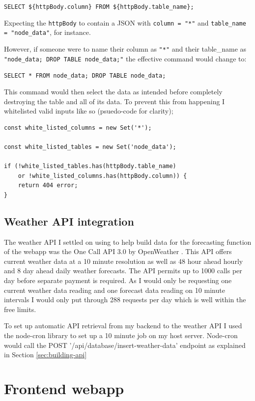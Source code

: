 \verb|SELECT ${httpBody.column} FROM ${httpBody.table_name};|

Expecting the \verb|httpBody| to contain a JSON with \texttt{column = "*"} and
\texttt{table\_name = "node\_data"}, for instance.

However, if someone were to name their column as \texttt{"*"} and their
table\_name as \texttt{"node\_data; DROP TABLE node\_data;"} the effective
command would change to:

\verb|SELECT * FROM node_data; DROP TABLE node_data;|

This command would then select the data as intended before completely destroying
the table and all of its data. To prevent this from happening I whitelisted
valid inputs like so (psuedo-code for clarity);

\begin{verbatim}
const white_listed_columns = new Set('*');

const white_listed_tables = new Set('node_data');

if (!white_listed_tables.has(httpBody.table_name) 
    or !white_listed_columns.has(httpBody.column)) {
    return 404 error;
}
\end{verbatim}

\subsection{Weather API integration}\label{sec:weather-api}

The weather API I settled on using to help build data for the forecasting
function of the webapp was the One Call API 3.0 by OpenWeather
\cite{openweatherAPI}. This API offers current weather data at a 10 minute
resolution as well as 48 hour ahead hourly and 8 day ahead daily weather
forecasts. The API permits up to 1000 calls per day before separate payment is
required. As I would only be requesting one current weather data reading and one
forecast data reading on 10 minute intervals I would only put through 288
requests per day which is well within the free limits.

To set up automatic API retrieval from my backend to the weather API I used the
node-cron library \cite{node-cron} to set up a 10 minute job on my host server.
Node-cron would call the POST '/api/database/insert-weather-data' endpoint as
explained in Section \ref{sec:building-api}

\section{Frontend webapp}\label{sec:front-end}

